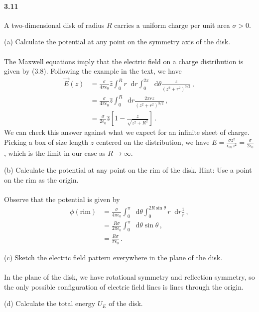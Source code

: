 \documentclass{article}
\newcommand*\diff{\mathop{}\!\mathrm{d}}
\newcommand*\te[1]{\text{#1}}
\newcommand*\ps[1]{\left[#1\right]}
\newcommand*\f[2]{\frac{#1}{#2}}
\begin{document}
\paragraph{3.11} A two-dimensional disk of radius $R$ carries a uniform charge per unit area $\sigma>0$.
\begin{description}
\item{(a)} Calculate the potential at any point on the symmetry axis of the disk.
\\\\
The Maxwell equations imply that the electric field on a charge distribution is given by (3.8). Following the example in the text, we have
\begin{align}
\vec E(z) &= \f{\sigma}{4\pi\epsilon_0}\hat z\int_0^Rr\diff r\int_0^{2\pi}\diff\theta\f{z}{(z^2+r^2)^{3/2}}\,,\\
&= \f{\sigma}{4\pi\epsilon_0}\hat z\int_0^R\diff r\f{2\pi r z}{(z^2+r^2)^{3/2}}\,,\\
&= \f{\sigma}{2\epsilon_0}\hat z\ps{1-\f{z}{\sqrt{z^2+R^2}}}\,.
\end{align}
We can check this answer against what we expect for an infinite sheet of charge. Picking a box of size length $z$ centered on the distribution, we have $E = \f{\sigma z^2}{\epsilon_02z^2} = \f\sigma{2\epsilon_0}$, which is the limit in our case as $R\to\infty$.
\item{(b)} Calculate the potential at any point on the rim of the disk. Hint: Use a point on the rim as the origin.
\\\\
Observe that the potential is given by
\begin{align}
\phi(\te{rim}) &= \f{\sigma}{4\pi\epsilon_0}\int_0^{\pi}\diff\theta \int_0^{2R\sin\theta} r\diff r\f{1}{r}\,,\\
&= \f{R\sigma}{2\pi\epsilon_0}\int_0^{\pi}\diff\theta \sin\theta\,,\\
&= \f{R\sigma}{\pi\epsilon_0}\,.
\end{align}
\item{(c)} Sketch the electric field pattern everywhere in the plane of the disk.
\\\\
In the plane of the disk, we have rotational symmetry and reflection symmetry, so the only possible configuration of electric field lines is lines through the origin.
\item{(d)} Calculate the total energy $U_E$ of the disk.
\end{description}
\end{document}
